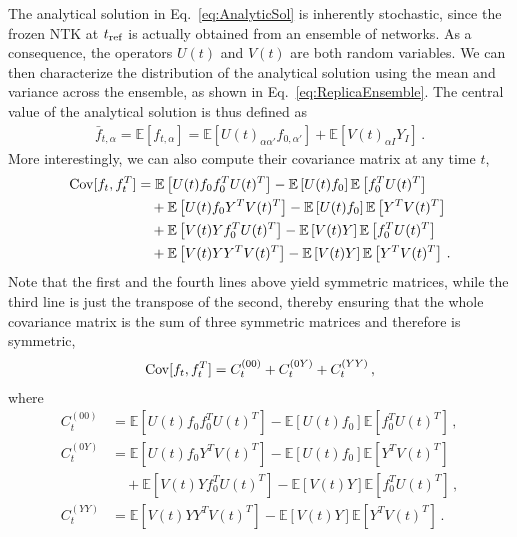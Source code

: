 The analytical solution in Eq.~\eqref{eq:AnalyticSol} is inherently stochastic,
since the frozen NTK at $t_{\rm ref}$ is actually obtained from an ensemble of
networks. As a consequence, the operators $U(t)$ and $V(t)$ are both random
variables. We can then characterize the distribution of the analytical solution
using the mean and variance across the ensemble, as shown in
Eq.~\eqref{eq:ReplicaEnsemble}. The central value of the analytical solution is thus
defined as
\begin{align}
    \label{eq:MeanValAtT}
    \bar{f}_{t,\alpha} = \mathbb{E}\left[f_{t,\alpha}\right]
        = \mathbb{E}\left[U(t)_{\alpha\alpha'} f_{0,\alpha'}\right]
            + \mathbb{E}\left[V(t)_{\alpha I} Y_I\right] \, .
\end{align}
More interestingly, we can also compute their covariance matrix at any time $t$,
\begin{align}
    \mathrm{Cov}[f_t,f_t^T]
        &= \mathbb{E}\left[U(t) f_0 f_0^T U(t)^T\right] 
            - \mathbb{E}\left[U(t) f_0\right] \mathbb{E}\left[f_0^T U(t)^T\right]  \nonumber \\
        &\quad + \mathbb{E}\left[U(t) f_0 Y^T V(t)^T\right] 
            - \mathbb{E}\left[U(t) f_0\right] \mathbb{E}\left[Y^T V(t)^T\right] \nonumber \\
        &\quad + \mathbb{E}\left[V(t) Y f_0^T U(t)^T\right]
            - \mathbb{E}\left[V(t) Y\right] \mathbb{E}\left[f_0^T U(t)^T\right] \nonumber \\
    \label{eq:CovAtT}
        &\quad + \mathbb{E}\left[V(t) Y Y^T V(t)^T\right]
            - \mathbb{E}\left[V(t) Y\right] \mathbb{E}\left[Y^T V(t)^T\right] \, .
\end{align}
Note that the first and the fourth lines above yield symmetric matrices, while
the third line is just the transpose of the second, thereby ensuring that the
whole covariance matrix is the sum of three symmetric matrices and therefore is
symmetric, 
\begin{align}
    \label{eq:SumOfCovariances}
    \mathrm{Cov}[f_t,f_t^T] = C_t^{(00)} + C_t^{(0Y)} + C_t^{(YY)}\, ,
\end{align}
where
\begin{align}
    \label{eq:C00term}
    C_t^{(00)} 
        &= \mathbb{E}\left[U(t) f_0 f_0^T U(t)^T\right] 
        - \mathbb{E}\left[U(t) f_0\right] \mathbb{E}\left[f_0^T U(t)^T\right]\, ,\\
    C_t^{(0Y)}
        &= \mathbb{E}\left[U(t) f_0 Y^T V(t)^T\right] 
        - \mathbb{E}\left[U(t) f_0\right] \mathbb{E}\left[Y^T V(t)^T\right] \nonumber \\
        \label{eq:C0Yterm}
        &\quad + \mathbb{E}\left[V(t) Y f_0^T U(t)^T\right]
            - \mathbb{E}\left[V(t) Y\right] \mathbb{E}\left[f_0^T U(t)^T\right] \, ,\\
    C_t^{(YY)}
        &= \mathbb{E}\left[V(t) Y Y^T V(t)^T\right]
        - \mathbb{E}\left[V(t) Y\right] \mathbb{E}\left[Y^T V(t)^T\right]\, .
        \label{eq:CYYterm}
\end{align}
